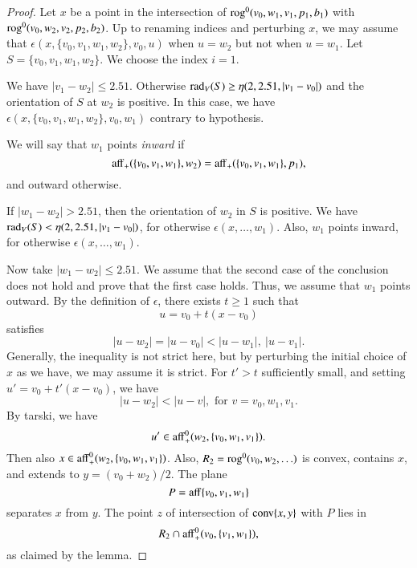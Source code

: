 \begin{proof}
Let $x$ be a point in the intersection of ${\operatorname{rog}}^0(v_0,w_1,v_1,p_1,b_1)$ 
with ${\operatorname{rog}}^0(v_0,w_2,v_2,p_2,b_2)$.  Up to renaming indices and perturbing $x$,
we may assume that
$\epsilon(x,\{v_0,v_1,w_1,w_2\},v_0,u)$ when $u=w_2$ but not when $u=w_1$.  
Let $S=\{v_0,v_1,w_1,w_2\}$.
We choose the index $i=1$.

We have $|v_1-w_2|\le 2.51$. 
Otherwise $\operatorname{rad}_V(S) \ge \eta(2,2.51,|v_1-v_0|)$ and
the orientation of $S$ at $w_2$ is positive.  In this case, we have
$\epsilon(x,\{v_0,v_1,w_1,w_2\},v_0,w_1)$ contrary to hypothesis.  

We will say that $w_1$ points {\it inward} if
     $$
     {\operatorname{aff}}_+(\{v_0,v_1,w_1\},w_2) = {\operatorname{aff}}_+(\{v_0,v_1,w_1\},p_1),
     $$
and outward otherwise.

If $|w_1-w_2|> 2.51$, then the orientation of $w_2$ in $S$ is positive.
We have $\operatorname{rad}_V(S) < \eta(2,2.51,|v_1-v_0|)$, for otherwise
$\epsilon(x,\ldots,w_1)$.   Also, $w_1$ points inward, for otherwise
$\epsilon(x,\ldots,w_1)$.

Now take $|w_1-w_2|\le 2.51$. 
We assume that the second case of the conclusion does not hold and prove that
the first case holds.  Thus, we assume that $w_1$ points outward.
By the definition of $\epsilon$, there exists $t\ge 1$ such
that $$u = v_0 + t (x- v_0)$$ satisfies
$$|u - w_2|=|u-v_0| < |u-w_1|,\ |u-v_1|.$$
Generally, the inequality is not strict here, but by perturbing the initial
choice of $x$ as we have, we may assume it is strict.
For $t'>t$ sufficiently small, and setting $u' = v_0 + t'(x-v_0)$, we
have
$$
  |u - w_2| < |u-v|, \text{ for } v = v_0,w_1,v_1.
$$
By tarski, we have
$$
  u' \in {\operatorname{aff}}_+^0(w_2,\{v_0,w_1,v_1\}).
$$
Then also $x \in{\operatorname{aff}}_+^0(w_2,\{v_0,w_1,v_1\})$.
Also, $R_2 = {\operatorname{rog}}^0(v_0,w_2,\ldots)$
is convex, contains $x$, and extends to $y=(v_0+w_2)/2$.  
The plane
$$P  ={\operatorname{aff}}\{v_0,v_1,w_1\}$$ separates $x$ from $y$.  The point $z$
of intersection of ${\operatorname{conv}}\{x,y\}$ with $P$ lies in
   $$R_2 \cap {\operatorname{aff}}_+^0(v_0,\{v_1,w_1\}),$$
as claimed by the lemma.
\end{proof}

